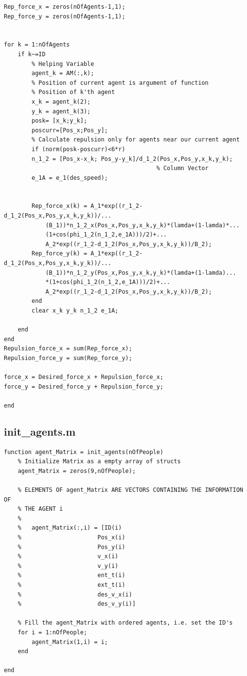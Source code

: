 \documentclass[11pt]{article}
\begin{document}
\begin{lstlisting}[frame= lines]
Rep_force_x = zeros(nOfAgents-1,1);
Rep_force_y = zeros(nOfAgents-1,1);


for k = 1:nOfAgents
    if k~=ID
        % Helping Variable
        agent_k = AM(:,k);
        % Position of current agent is argument of function
        % Position of k'th agent
        x_k = agent_k(2);
        y_k = agent_k(3);
        posk= [x_k;y_k];
        poscurr=[Pos_x;Pos_y];
        % Calculate repulsion only for agents near our current agent
        if (norm(posk-poscurr)<6*r)
        n_1_2 = [Pos_x-x_k; Pos_y-y_k]/d_1_2(Pos_x,Pos_y,x_k,y_k);
                                            % Column Vector
        e_1A = e_1(des_speed);
        
        
        Rep_force_x(k) = A_1*exp((r_1_2-d_1_2(Pos_x,Pos_y,x_k,y_k))/...
            (B_1))*n_1_2_x(Pos_x,Pos_y,x_k,y_k)*(lamda+(1-lamda)*...
            (1+cos(phi_1_2(n_1_2,e_1A)))/2)+...
            A_2*exp((r_1_2-d_1_2(Pos_x,Pos_y,x_k,y_k))/B_2);
        Rep_force_y(k) = A_1*exp((r_1_2-d_1_2(Pos_x,Pos_y,x_k,y_k))/...
            (B_1))*n_1_2_y(Pos_x,Pos_y,x_k,y_k)*(lamda+(1-lamda)...
            *(1+cos(phi_1_2(n_1_2,e_1A)))/2)+...
            A_2*exp((r_1_2-d_1_2(Pos_x,Pos_y,x_k,y_k))/B_2);
        end
        clear x_k y_k n_1_2 e_1A;
        
    end
end
Repulsion_force_x = sum(Rep_force_x);
Repulsion_force_y = sum(Rep_force_y);

force_x = Desired_force_x + Repulsion_force_x;
force_y = Desired_force_y + Repulsion_force_y;

end
\end{lstlisting}


\subsection*{init\_agents.m}
\begin{lstlisting}[frame=lines]
% Agent initializing function
function agent_Matrix = init_agents(nOfPeople)
    % Initialize Matrix as a empty array of structs
    agent_Matrix = zeros(9,nOfPeople);
    
    % ELEMENTS OF agent_Matrix ARE VECTORS CONTAINING THE INFORMATION OF
    % THE AGENT i
    %
    %   agent_Matrix(:,i) = [ID(i) 
    %                      Pos_x(i)
    %                      Pos_y(i)
    %                      v_x(i)
    %                      v_y(i)
    %                      ent_t(i)
    %                      ext_t(i)
    %                      des_v_x(i)
    %                      des_v_y(i)]
 
    % Fill the agent_Matrix with ordered agents, i.e. set the ID's
    for i = 1:nOfPeople;
        agent_Matrix(1,i) = i; 
    end

end
\end{lstlisting}
\end{document}
